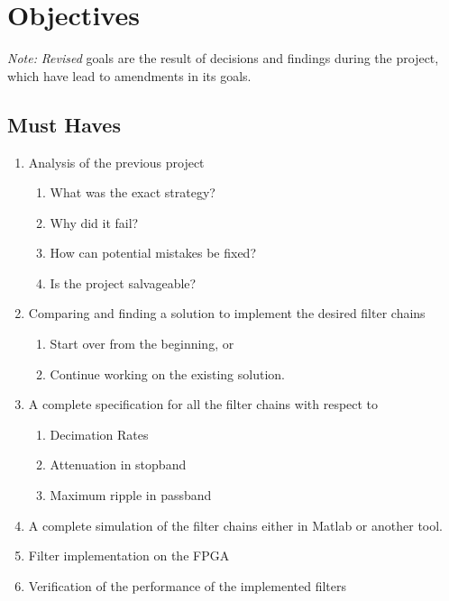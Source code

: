 \documentclass[a4paper,oneside]{alpenspecs/alpenspecs}
\begin{document}
\chapter{Objectives} %
\label{ch:objectives}

\emph{Note:} \emph{Revised}  goals are  the result  of decisions  and findings
during the project, which have lead to amendments in its goals.

\section{Must Haves}
    \begin{enumerate}
        \item Analysis of the previous project
        \begin{enumerate}
            \item What was the exact strategy?
            \item Why did it fail?
            \item How can potential mistakes be fixed?
            \item Is the project salvageable?
        \end{enumerate}
            \item Comparing and finding a solution to implement the desired filter chains
        \begin{enumerate}    
            \item Start over from the beginning, or
            \item Continue working on the existing solution.
        \end{enumerate}
            \item A complete specification for all the filter chains with respect to
        \begin{enumerate}
            \item Decimation Rates
            \item Attenuation in stopband
            \item Maximum ripple in passband
        \end{enumerate}
        \item A complete simulation of the filter chains either in Matlab or another tool.
        \item Filter implementation on the FPGA
        \item Verification of the performance of the implemented filters
    \end{enumerate}
\end{document}
